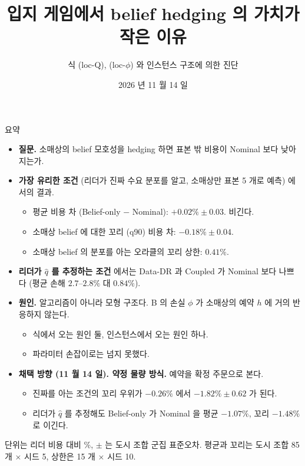 \documentclass[aspectratio=169,11pt]{beamer}
\title[입지 게임의 belief hedging]{입지 게임에서 belief hedging 의 가치가 작은 이유}
\subtitle{식 (loc-Q), (loc-$\phi$) 와 인스턴스 구조에 의한 진단}
\date{2026 년 11 월 14 일}
\begin{document}
\begin{frame}
\titlepage
\end{frame}

\begin{frame}{요약}
\begin{itemize}
  \item \textbf{질문.} 소매상의 belief 모호성을 hedging 하면 표본 밖 비용이 Nominal 보다 낮아지는가.
  \item \textbf{가장 유리한 조건} (리더가 진짜 수요 분포를 알고, 소매상만 표본 5 개로 예측) 에서의 결과.
  \begin{itemize}
    \item 평균 비용 차 (Belief-only $-$ Nominal): $+0.02\% \pm 0.03$. 비긴다.
    \item 소매상 belief 에 대한 꼬리 (q90) 비용 차: $-0.18\% \pm 0.04$.
    \item 소매상 belief 의 분포를 아는 오라클의 꼬리 상한: $0.41\%$.
  \end{itemize}
  \item \textbf{리더가 $\hat q$ 를 추정하는 조건} 에서는 Data-DR 과 Coupled 가 Nominal 보다 나쁘다 (평균 손해 $2.7$--$2.8\%$ 대 $0.84\%$).
  \item \textbf{원인.} 알고리즘이 아니라 모형 구조다. B 의 손실 $\phi$ 가 소매상의 예약 $h$ 에 거의 반응하지 않는다.
  \begin{itemize}
    \item 식에서 오는 원인 둘, 인스턴스에서 오는 원인 하나.
    \item 파라미터 손잡이로는 넘지 못했다.
  \end{itemize}
  \item \textbf{채택 방향 (11 월 14 일). 약정 물량 방식.} 예약을 확정 주문으로 본다.
  \begin{itemize}
    \item 진짜를 아는 조건의 꼬리 우위가 $-0.26\%$ 에서 $-1.82\% \pm 0.62$ 가 된다.
    \item 리더가 $\hat q$ 를 추정해도 Belief-only 가 Nominal 을 평균 $-1.07\%$, 꼬리 $-1.48\%$ 로 이긴다.
  \end{itemize}
\end{itemize}
\vfill
{\footnotesize 단위는 리더 비용 대비 \%, $\pm$ 는 도시 조합 군집 표준오차. 평균과 꼬리는 도시 조합 85 개 $\times$ 시드 5, 상한은 15 개 $\times$ 시드 10.}
\end{frame}
\end{document}
